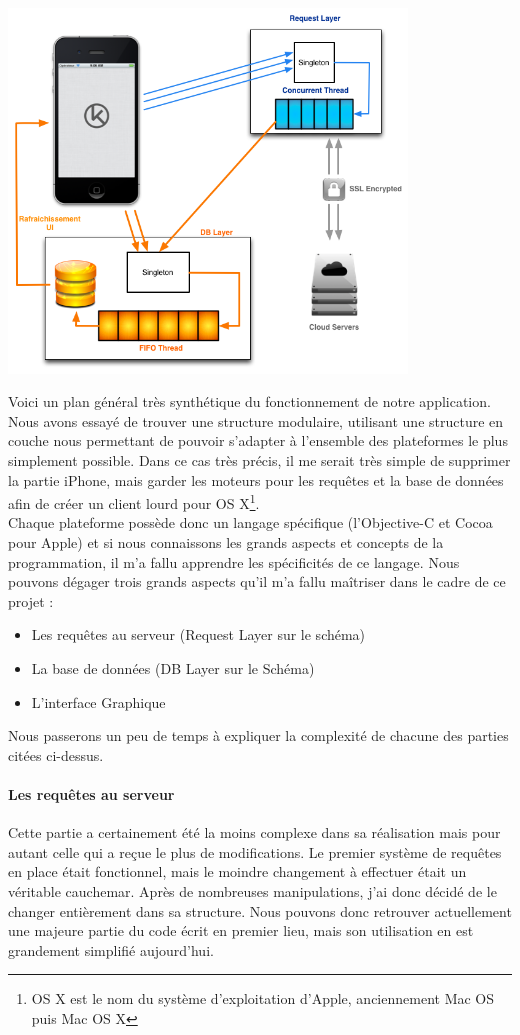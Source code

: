 \documentclass{article}
\begin{document}
\includegraphics[width=400px]{Images/schema_general_simplifie.png}

Voici un plan général très synthétique du fonctionnement de notre application. Nous avons essayé de trouver une structure modulaire, utilisant une structure en couche nous permettant de pouvoir s'adapter à l'ensemble des plateformes le plus simplement possible. Dans ce cas très précis, il me serait très simple de supprimer la partie iPhone, mais garder les moteurs pour les requêtes et la base de données afin de créer un client lourd pour OS X\footnote{OS X est le nom du système d'exploitation d'Apple, anciennement Mac OS puis Mac OS X}.\\

Chaque plateforme possède donc un langage spécifique (l'Objective-C et Cocoa pour Apple) et si nous connaissons les grands aspects et concepts de la programmation, il m'a fallu apprendre les spécificités de ce langage. Nous pouvons dégager trois grands aspects qu'il m'a fallu maîtriser dans le cadre de ce projet : 


\begin{itemize}
	\item Les requêtes au serveur (Request Layer sur le schéma)
	\item La base de données (DB Layer sur le Schéma)
	\item L'interface Graphique
\end{itemize}
Nous passerons un peu de temps à expliquer la complexité de chacune des parties citées ci-dessus.
		\paragraph{Les requêtes au serveur}
		Cette partie a certainement été la moins complexe dans sa réalisation mais pour autant celle qui a  re\c cue le plus de modifications. Le premier système de requêtes en place était fonctionnel, mais le moindre changement à effectuer était un véritable cauchemar. Après de nombreuses manipulations, j'ai donc décidé de le changer entièrement dans sa structure. Nous pouvons donc retrouver actuellement une majeure partie du code écrit en premier lieu, mais son utilisation en est grandement simplifié aujourd'hui.\\
		
\end{document}
